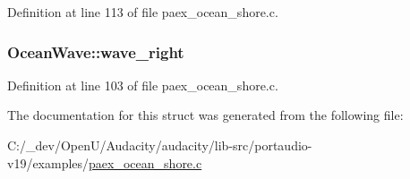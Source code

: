 Definition at line 113 of file paex\+\_\+ocean\+\_\+shore.\+c.

\subsubsection[{\texorpdfstring{wave\+\_\+right}{wave_right}}]{ Ocean\+Wave\+::wave\+\_\+right}\hypertarget{struct_ocean_wave_a9a4be6c3658f3b1d621be571347c23d4}{}\label{struct_ocean_wave_a9a4be6c3658f3b1d621be571347c23d4}


Definition at line 103 of file paex\+\_\+ocean\+\_\+shore.\+c.



The documentation for this struct was generated from the following file\+:\begin{DoxyCompactItemize}
\item 
C\+:/\+\_\+dev/\+Open\+U/\+Audacity/audacity/lib-\/src/portaudio-\/v19/examples/\hyperlink{paex__ocean__shore_8c}{paex\+\_\+ocean\+\_\+shore.\+c}\end{DoxyCompactItemize}
